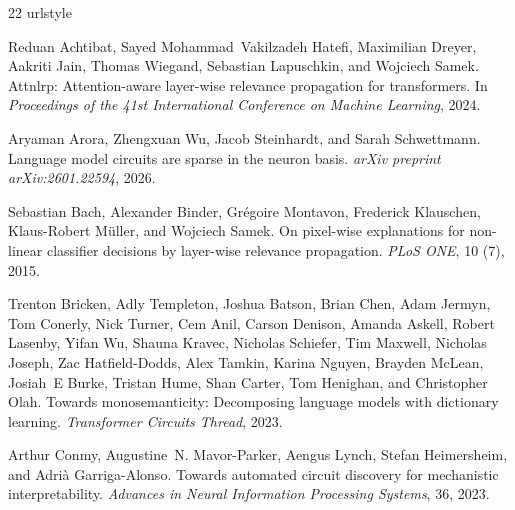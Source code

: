\documentclass[11pt]{article}
\begin{document}
\begin{thebibliography}{22}
\providecommand{\natexlab}[1]{#1}
\providecommand{\url}[1]{\texttt{#1}}
\expandafter\ifx\csname urlstyle\endcsname\relax
  \providecommand{\doi}[1]{doi: #1}\else
  \providecommand{\doi}{doi: \begingroup \urlstyle{rm}\Url}\fi

Reduan Achtibat, Sayed Mohammad~Vakilzadeh Hatefi, Maximilian Dreyer, Aakriti
  Jain, Thomas Wiegand, Sebastian Lapuschkin, and Wojciech Samek.
\newblock Attnlrp: Attention-aware layer-wise relevance propagation for
  transformers.
\newblock In \emph{Proceedings of the 41st International Conference on Machine
  Learning}, 2024.

Aryaman Arora, Zhengxuan Wu, Jacob Steinhardt, and Sarah Schwettmann.
\newblock Language model circuits are sparse in the neuron basis.
\newblock \emph{arXiv preprint arXiv:2601.22594}, 2026.

Sebastian Bach, Alexander Binder, Gr{\'e}goire Montavon, Frederick Klauschen,
  Klaus-Robert M{\"u}ller, and Wojciech Samek.
\newblock On pixel-wise explanations for non-linear classifier decisions by
  layer-wise relevance propagation.
\newblock \emph{PLoS ONE}, 10 (7), 2015.

Trenton Bricken, Adly Templeton, Joshua Batson, Brian Chen, Adam Jermyn, Tom
  Conerly, Nick Turner, Cem Anil, Carson Denison, Amanda Askell, Robert
  Lasenby, Yifan Wu, Shauna Kravec, Nicholas Schiefer, Tim Maxwell, Nicholas
  Joseph, Zac Hatfield-Dodds, Alex Tamkin, Karina Nguyen, Brayden McLean,
  Josiah~E Burke, Tristan Hume, Shan Carter, Tom Henighan, and Christopher
  Olah.
\newblock Towards monosemanticity: Decomposing language models with dictionary
  learning.
\newblock \emph{Transformer Circuits Thread}, 2023.

Arthur Conmy, Augustine~N. Mavor-Parker, Aengus Lynch, Stefan Heimersheim, and
  Adri{\`a} Garriga-Alonso.
\newblock Towards automated circuit discovery for mechanistic interpretability.
\newblock \emph{Advances in Neural Information Processing Systems}, 36, 2023.


\end{thebibliography}
\end{document}

